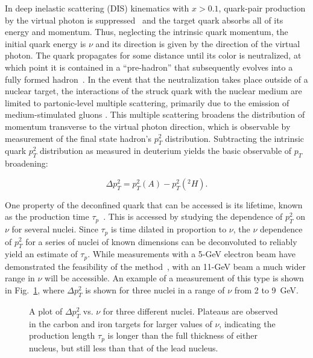 In deep inelastic scattering (DIS) kinematics with $x>0.1$, quark-pair 
production by the virtual photon is suppressed~\cite{DDBH} and the target 
quark absorbs all of its energy and momentum. Thus, neglecting the 
intrinsic quark momentum, the initial quark energy is $\nu$ and its 
direction is given by the direction of the virtual photon. The quark 
propagates for some distance until its color is neutralized, at which 
point it is contained in a ``pre-hadron'' that subsequently evolves into 
a fully formed hadron~\cite{KNPH}. In the event that the neutralization 
takes place outside of a nuclear target, the interactions of the struck 
quark with the nuclear medium are limited to partonic-level multiple 
scattering, primarily due to the emission of medium-stimulated gluons
\cite{XGXNW}. This multiple scattering broadens the distribution of 
momentum transverse to the virtual photon direction, which is observable 
by measurement of the final state hadron's $p_T^2$ distribution. 
Subtracting the intrinsic quark $p_T^2$ distribution as measured in 
deuterium yields the basic observable of $p_T$ broadening: 

\begin{equation}
\Delta p_T^2=p_T^2(A)-p_T^2(^2H).
\end{equation}

One property of the deconfined quark that can be accessed is its
lifetime, known as the production time $\tau_p$~\cite{SJBAHM88}. 
This is accessed by studying the dependence of $p_T^2$ on $\nu$ for 
several nuclei. Since $\tau_p$ is time dilated in proportion to $\nu$,
the $\nu$ dependence of $p_T^2$ for a series of nuclei of known
dimensions can be deconvoluted to reliably yield an estimate of
$\tau_p$. While measurements with a 5-GeV electron beam have
demonstrated the feasibility of the method~\cite{EG2,Haf06}, with an 11-GeV 
beam a much wider range in $\nu$ will be accessible. An example of a
measurement of this type is shown in Fig.~\ref{pt2}, where
$\Delta p_T^2$ is shown for three nuclei in a range of $\nu$ from 2 to
9~GeV. 

\begin{figure}[htbp]
\vspace{7.5cm}
\caption{\small{A plot of $\Delta p_T^2$ vs. $\nu$ for three different 
nuclei.  Plateaus are observed in the carbon and iron targets for larger 
values of $\nu$, indicating the production length $\tau_p$ is longer than 
the full thickness of either nucleus, but still less than that of the lead 
nucleus.}}
\label{pt2}
\end{figure}

